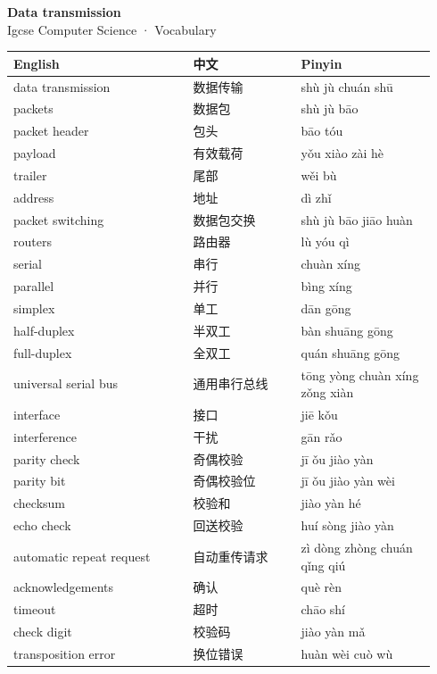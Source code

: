 \documentclass[11pt]{article}
\begin{document}
\begin{center}
  {\LARGE\bfseries Data transmission}\\[0.35em]
  {\large Igcse Computer Science · Vocabulary}
\end{center}
\vspace{0.6em}

\begin{longtable}{@{}p{0.40\linewidth}p{0.24\linewidth}p{0.30\linewidth}@{}}
\toprule
\textbf{English} & \textbf{中文} & \textbf{Pinyin} \\
\midrule
\endhead
\bottomrule
\endlastfoot
data transmission & 数据传输 & shù jù chuán shū \\
packets & 数据包 & shù jù bāo \\
packet header & 包头 & bāo tóu \\
payload & 有效载荷 & yǒu xiào zài hè \\
trailer & 尾部 & wěi bù \\
address & 地址 & dì zhǐ \\
packet switching & 数据包交换 & shù jù bāo jiāo huàn \\
routers & 路由器 & lù yóu qì \\
serial & 串行 & chuàn xíng \\
parallel & 并行 & bìng xíng \\
simplex & 单工 & dān gōng \\
half-duplex & 半双工 & bàn shuāng gōng \\
full-duplex & 全双工 & quán shuāng gōng \\
universal serial bus & 通用串行总线 & tōng yòng chuàn xíng zǒng xiàn \\
interface & 接口 & jiē kǒu \\
interference & 干扰 & gān rǎo \\
parity check & 奇偶校验 & jī ǒu jiào yàn \\
parity bit & 奇偶校验位 & jī ǒu jiào yàn wèi \\
checksum & 校验和 & jiào yàn hé \\
echo check & 回送校验 & huí sòng jiào yàn \\
automatic repeat request & 自动重传请求 & zì dòng zhòng chuán qǐng qiú \\
acknowledgements & 确认 & què rèn \\
timeout & 超时 & chāo shí \\
check digit & 校验码 & jiào yàn mǎ \\
transposition error & 换位错误 & huàn wèi cuò wù \\

\end{longtable}
\end{document}
